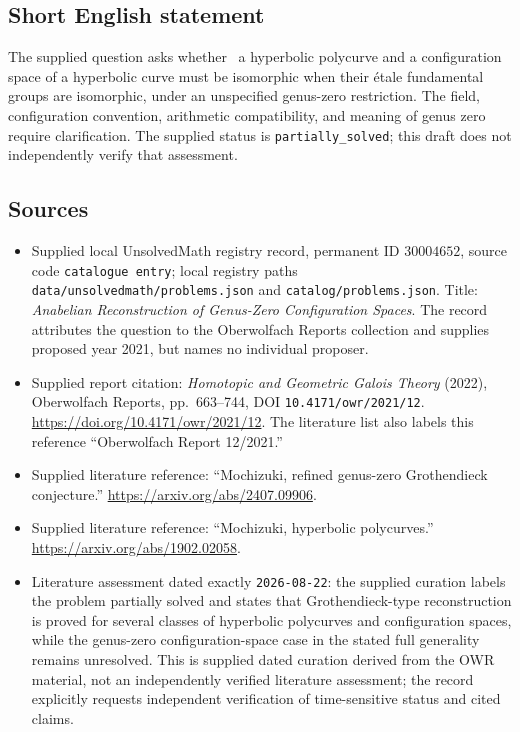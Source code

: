 \documentclass[11pt]{article}
\begin{document}
\subsection{Short English statement}
The supplied question asks whether \ a hyperbolic polycurve and a configuration space of a hyperbolic curve must be isomorphic when their \'{e}tale fundamental groups are isomorphic, under an unspecified genus-zero restriction. The field, configuration convention, arithmetic compatibility, and meaning of genus zero require clarification. The supplied status is \texttt{partially\_solved}; this draft does not independently verify that assessment.
\subsection{Sources}
\begin{itemize}
\item Supplied local UnsolvedMath registry record, permanent ID \(30004652\), source code \texttt{catalogue entry}; local registry paths \texttt{data/unsolvedmath/problems.json} and \texttt{catalog/problems.json}. Title: \emph{Anabelian Reconstruction of Genus-Zero Configuration Spaces}. The record attributes the question to the Oberwolfach Reports collection and supplies proposed year 2021, but names no individual proposer.
\item Supplied report citation: \emph{Homotopic and Geometric Galois Theory} (2022), Oberwolfach Reports, pp.~663--744, DOI \texttt{10.4171/owr/2021/12}. \url{https://doi.org/10.4171/owr/2021/12}. The literature list also labels this reference ``Oberwolfach Report 12/2021.''
\item Supplied literature reference: ``Mochizuki, refined genus-zero Grothendieck conjecture.'' \url{https://arxiv.org/abs/2407.09906}.
\item Supplied literature reference: ``Mochizuki, hyperbolic polycurves.'' \url{https://arxiv.org/abs/1902.02058}.
\item Literature assessment dated exactly \texttt{2026-08-22}: the supplied curation labels the problem partially solved and states that Grothendieck-type reconstruction is proved for several classes of hyperbolic polycurves and configuration spaces, while the genus-zero configuration-space case in the stated full generality remains unresolved. This is supplied dated curation derived from the OWR material, not an independently verified literature assessment; the record explicitly requests independent verification of time-sensitive status and cited claims.
\end{itemize}
\end{document}
